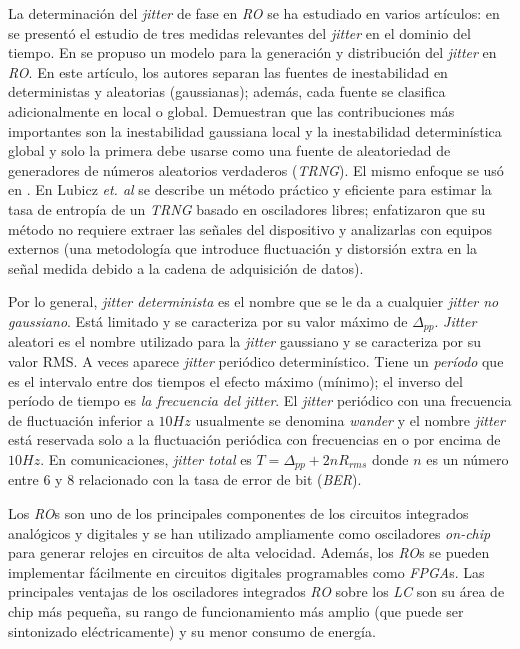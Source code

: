 La determinación del \textit{jitter} de fase en \emph{RO} se ha estudiado en varios artículos: en \cite{McNeill1997} se presentó el estudio de tres medidas relevantes del \textit{jitter} en el dominio del tiempo.
En \cite{Valtchanov2008} se propuso un modelo para la generación y distribución del \textit{jitter} en \emph{RO}.
En este artículo, los autores separan las fuentes de inestabilidad en deterministas y aleatorias (gaussianas); además, cada fuente se clasifica adicionalmente en local o global.
Demuestran que las contribuciones más importantes son la inestabilidad gaussiana local y la inestabilidad determinística global y solo la primera debe usarse como una fuente de aleatoriedad de generadores de números aleatorios verdaderos (\emph{TRNG}).
El mismo enfoque se usó en \cite{Fischer2008, Valtchanov2010, Baudet2011, Jessa2011}.
En Lubicz \textit{et. al} se describe un método práctico y eficiente para estimar la tasa de entropía de un \emph{TRNG} basado en osciladores libres; enfatizaron que su método no requiere extraer las señales del dispositivo y analizarlas con equipos externos \cite{Lubicz2014} (una metodología que introduce fluctuación y distorsión extra en la señal medida debido a la cadena de adquisición de datos).

Por lo general, \emph{jitter determinista} es el nombre que se le da a cualquier \emph{jitter no gaussiano}.
Está limitado y se caracteriza por su valor máximo de $\Delta_{pp}$.
\textit{Jitter} aleatori es el nombre utilizado para la \textit{jitter} gaussiano y se caracteriza por su valor RMS.
A veces aparece \textit{jitter} periódico determinístico.
Tiene un \emph{período} que es el intervalo entre dos tiempos el efecto máximo (mínimo); el inverso del período de tiempo es \emph{la frecuencia del jitter}.
El \textit{jitter} periódico con una frecuencia de fluctuación inferior a $10 Hz$ usualmente se denomina \emph{wander} y el nombre \emph{jitter} está reservada solo a la fluctuación periódica con frecuencias en o por encima de $10 Hz$.
En comunicaciones, \emph{jitter total} es $T = \Delta_{pp} + 2nR_{rms}$ donde $n$ es un número entre $6$ y $8$ relacionado con la tasa de error de bit (\emph{BER}).

Los \emph{RO}s son uno de los principales componentes de los circuitos integrados analógicos y digitales y se han utilizado ampliamente como osciladores \emph{on-chip} para generar relojes en circuitos de alta velocidad.
Además, los \emph{RO}s se pueden implementar fácilmente en circuitos digitales programables como \emph{FPGA}s.
Las principales ventajas de los osciladores integrados \emph{RO} sobre los \emph{LC} son su área de chip más pequeña, su rango de funcionamiento más amplio (que puede ser sintonizado eléctricamente) y su menor consumo de energía.

